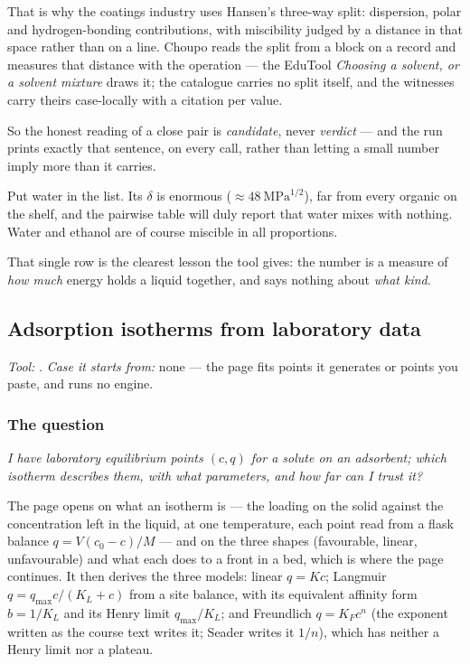 \documentclass[11pt,a4paper]{article}
\begin{document}
That is why the coatings industry uses Hansen's three-way split:
dispersion, polar and hydrogen-bonding contributions, with miscibility
judged by a distance in that space rather than on a line.  Choupo reads
the split from a  block on a record and measures that
distance with the  operation --- the EduTool
\emph{Choosing a solvent, or a solvent mixture} draws it; the catalogue
carries no split itself, and the witnesses carry theirs case-locally
with a citation per value.

So the honest reading of a close pair is \emph{candidate}, never
\emph{verdict} --- and the run prints exactly that sentence, on every
call, rather than letting a small number imply more than it carries.

\begin{tryit}
Put water in the list.  Its $\delta$ is enormous
($\approx 48~\mathrm{MPa}^{1/2}$), far from every organic on
the shelf, and the pairwise table will duly report that water mixes with
nothing.  Water and ethanol are of course miscible in all proportions.

That single row is the clearest lesson the tool gives: the number is a
measure of \emph{how much} energy holds a liquid together, and says
nothing about \emph{what kind}.
\end{tryit}

\subsection{Adsorption isotherms from laboratory data}\label{sec:edu-adsorption-isotherms}


\noindent\textit{\small Tool:} .
\textit{\small Case it starts from:} none --- the page fits points it
generates or points you paste, and runs no engine.

\subsubsection*{The question}

\emph{I have laboratory equilibrium points $(c, q)$ for a solute on an
adsorbent; which isotherm describes them, with what parameters, and how far
can I trust it?}

The page opens on what an isotherm is --- the loading on the solid against
the concentration left in the liquid, at one temperature, each point read
from a flask balance $q = V(c_0-c)/M$ --- and on the three shapes
(favourable, linear, unfavourable) and what each does to a front in a bed,
which is where the  page continues.  It then derives the
three models: linear $q = Kc$; Langmuir $q = q_{\max}c/(K_L+c)$ from a site
balance, with its equivalent affinity form $b = 1/K_L$ and its Henry limit
$q_{\max}/K_L$; and Freundlich $q = K_F c^{n}$ (the exponent written as the course text writes it; Seader writes it $1/n$), which has neither a Henry
limit nor a plateau.
\end{document}
